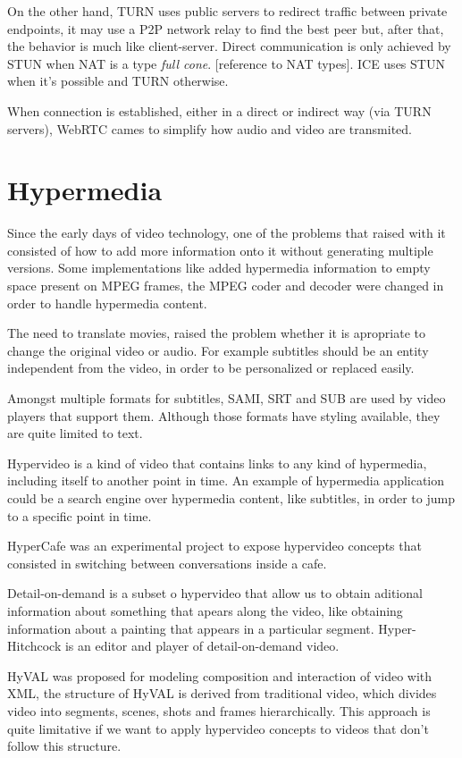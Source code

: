 \documentclass[11pt,twocolumn]{article}
\begin{document}
On the other hand, TURN uses public servers to redirect traffic between private endpoints, it may use a P2P network relay to find the best peer but, after that, the behavior is much like client-server. Direct communication is only achieved by STUN when NAT is a type \textit{full cone}. {\color{red} [reference to NAT types]}. ICE uses STUN when it's possible and TURN otherwise.

When connection is established, either in a direct or indirect way (via TURN servers), WebRTC cames to simplify how audio and video are transmited. 

\section{Hypermedia}

  Since the early days of video technology, one of the problems that raised with it consisted of how to add more information onto it without generating multiple versions. Some implementations like \cite{embedded} added hypermedia information to empty space present on MPEG frames, the MPEG coder and decoder were changed in order to handle hypermedia content.

  The need to translate movies, raised the problem whether it is apropriate to change the original video or audio. For example subtitles should be an entity independent from the video, in order to be personalized or replaced easily.
 
  Amongst multiple formats for subtitles, SAMI, SRT and SUB are used by video players that support them. Although those formats have styling available, they are quite limited to text. 

  Hypervideo is a kind of video that contains links to any kind of hypermedia, including itself to another point in time. An example of hypermedia application could be a search engine over hypermedia content, like subtitles, in order to jump to a specific point in time. 

  HyperCafe \cite{hypercafe} was an experimental project to expose hypervideo concepts that consisted in switching between conversations inside a cafe. 

  Detail-on-demand is a subset o hypervideo that allow us to obtain aditional information about something that apears along the video, like obtaining information about a painting that appears in a particular segment. Hyper-Hitchcock\cite{hitchcock} is an editor and player of detail-on-demand video.

  HyVAL\cite{hyval} was proposed for modeling composition and interaction of video with XML, the structure of HyVAL is derived from traditional video, which divides video into segments, scenes, shots and frames hierarchically. This approach is quite limitative if we want to apply hypervideo concepts to videos that don't follow this structure.
\end{document}
